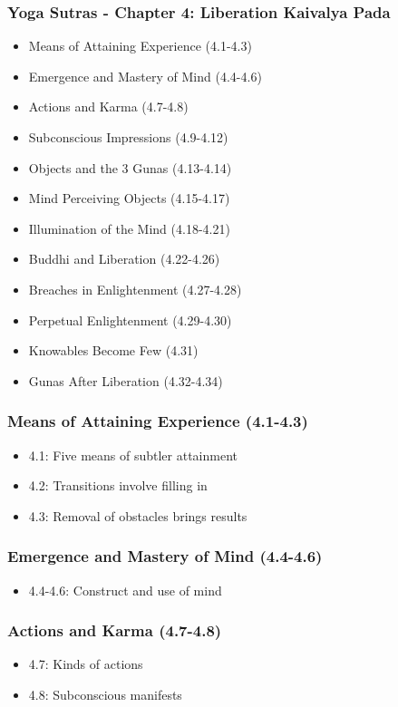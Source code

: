 \begin{frame}[fragile]\frametitle{Yoga Sutras - Chapter 4: Liberation Kaivalya Pada}
\begin{itemize}
\item Means of Attaining Experience (4.1-4.3)
\item Emergence and Mastery of Mind (4.4-4.6)
\item Actions and Karma (4.7-4.8)
\item Subconscious Impressions (4.9-4.12)
\item Objects and the 3 Gunas (4.13-4.14)
\item Mind Perceiving Objects (4.15-4.17)
\item Illumination of the Mind (4.18-4.21)
\item Buddhi and Liberation (4.22-4.26)
\item Breaches in Enlightenment (4.27-4.28)
\item Perpetual Enlightenment (4.29-4.30)
\item Knowables Become Few (4.31)
\item Gunas After Liberation (4.32-4.34)
\end{itemize}
\end{frame}

\begin{frame}[fragile]\frametitle{Means of Attaining Experience (4.1-4.3)}
\begin{itemize}
\item 4.1: Five means of subtler attainment
\item 4.2: Transitions involve filling in
\item 4.3: Removal of obstacles brings results
\end{itemize}
\end{frame}

\begin{frame}[fragile]\frametitle{Emergence and Mastery of Mind (4.4-4.6)}
\begin{itemize}
\item 4.4-4.6: Construct and use of mind
\end{itemize}
\end{frame}

\begin{frame}[fragile]\frametitle{Actions and Karma (4.7-4.8)}
\begin{itemize}
\item 4.7: Kinds of actions
\item 4.8: Subconscious manifests
\end{itemize}
\end{frame}

